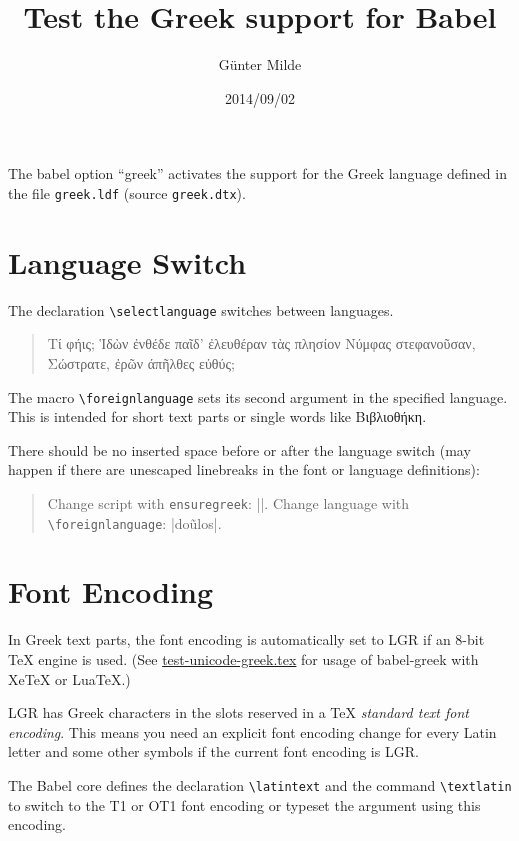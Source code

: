 \documentclass[a4paper]{article}
\begin{document}
\title{Test the Greek support for Babel}
\author{Günter Milde}
\date{2014/09/02}
\maketitle

The babel option ``greek'' activates the support for the Greek language
defined in the file \texttt{greek.ldf} (source \texttt{greek.dtx}).

\section{Language Switch}

The declaration \verb|\selectlanguage| switches between languages.

\begin{quote}
  Τί φήις; Ἱδὼν ἐνθέδε παῖδ’ ἐλευθέραν
  τὰς πλησίον Νύμφας στεφανοῦσαν, Σώστρατε,
  ἐρῶν άπῆλθες εὐθύς;
\end{quote}

The macro \verb|\foreignlanguage| sets its second argument in the specified
language. This is intended for short text parts or single words like
\foreignlanguage{greek}{Βιβλιοθήκη}.

There should be no inserted space before or after the language switch (may
happen if there are unescaped linebreaks in the font or language definitions):

\begin{quote}
  Change script with \verb|ensuregreek|: ||. Change
  language with \verb|\foreignlanguage|: |\foreignlanguage{greek}{do\~ulos}|.
\end{quote}

\section{Font Encoding}

In Greek text parts, the font encoding is automatically set to LGR if an
8-bit TeX engine is used. (See \url{test-unicode-greek.tex} for usage of
babel-greek with XeTeX or LuaTeX.)

LGR has Greek characters in the slots reserved in a TeX \emph{standard text
font encoding}. This means you need an explicit font encoding change for
every Latin letter and some other symbols if the current font encoding is
LGR.

The Babel core defines the declaration \verb|\latintext| and the command
\verb|\textlatin| to switch to the T1 or OT1 font encoding or typeset the
argument using this encoding.
\end{document}
